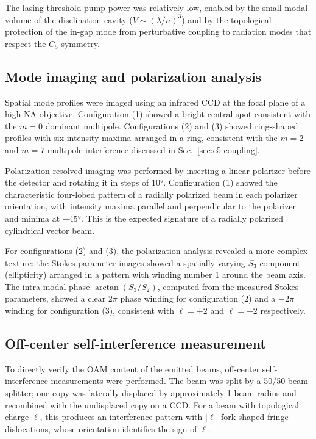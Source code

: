 \documentclass[12pt,a4paper,oneside]{book}
\theoremstyle{plain}
\theoremstyle{definition}
\theoremstyle{remark}
\newcommand{\secref}[1]{Sec.~\ref{#1}}
\begin{document}
The lasing threshold pump power was relatively low, enabled by the small modal volume of the disclination cavity ($V \sim (\lambda/n)^3$) and by the topological protection of the in-gap mode from perturbative coupling to radiation modes that respect the $C_5$ symmetry.

\subsection{Mode imaging and polarization analysis}
\label{subsec:mode-imaging}

Spatial mode profiles were imaged using an infrared CCD at the focal plane of a high-NA objective. Configuration (1) showed a bright central spot consistent with the $m=0$ dominant multipole. Configurations (2) and (3) showed ring-shaped profiles with six intensity maxima arranged in a ring, consistent with the $m=2$ and $m=7$ multipole interference discussed in \secref{sec:c5-coupling}.

Polarization-resolved imaging was performed by inserting a linear polarizer before the detector and rotating it in steps of $10°$. Configuration (1) showed the characteristic four-lobed pattern of a radially polarized beam in each polarizer orientation, with intensity maxima parallel and perpendicular to the polarizer and minima at $\pm 45°$. This is the expected signature of a radially polarized cylindrical vector beam.

For configurations (2) and (3), the polarization analysis revealed a more complex texture: the Stokes parameter images showed a spatially varying $S_3$ component (ellipticity) arranged in a pattern with winding number 1 around the beam axis. The intra-modal phase $\arctan(S_3/S_2)$, computed from the measured Stokes parameters, showed a clear $2\pi$ phase winding for configuration (2) and a $-2\pi$ winding for configuration (3), consistent with $\ell = +2$ and $\ell = -2$ respectively.

\subsection{Off-center self-interference measurement}
\label{subsec:interference}

To directly verify the OAM content of the emitted beams, off-center self-interference measurements were performed. The beam was split by a 50/50 beam splitter; one copy was laterally displaced by approximately 1 beam radius and recombined with the undisplaced copy on a CCD. For a beam with topological charge $\ell$, this produces an interference pattern with $|\ell|$ fork-shaped fringe dislocations, whose orientation identifies the sign of $\ell$.
\end{document}
